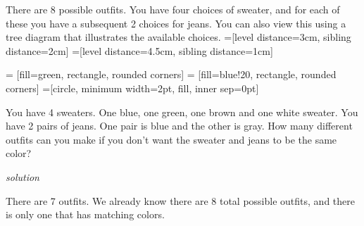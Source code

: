 \documentclass{amsbook}
\begin{document}
\begin{Answer}[ref={m1}]
    There are 8 possible outfits. You have four choices of sweater, and for each of these you have a subsequent 2 choices for jeans. You can also view this using a tree diagram that illustrates the available choices. 
=[level distance=3cm, sibling distance=2cm]
=[level distance=4.5cm, sibling distance=1cm]

 = [fill=green, rectangle, rounded corners]
 = [fill=blue!20, rectangle, rounded corners]
=[circle, minimum width=2pt, fill, inner sep=0pt]
\end{Answer}

\begin{Exercise}[title={Choices with a Restriction}, difficulty=1, label=m2]
    You have 4 sweaters. One blue, one green, one brown and one white sweater. You have 2 pairs of jeans. One pair is blue and the other is gray. How many different outfits can you make if you don't want the sweater and jeans to be the same color? 
    
    \hfill \emph{solution} 
\end{Exercise}

\begin{Answer}[ref={m2}]
    There are 7 outfits. We already know there are 8 total possible outfits, and there is only one that has matching colors.
\end{Answer}
\end{document}
